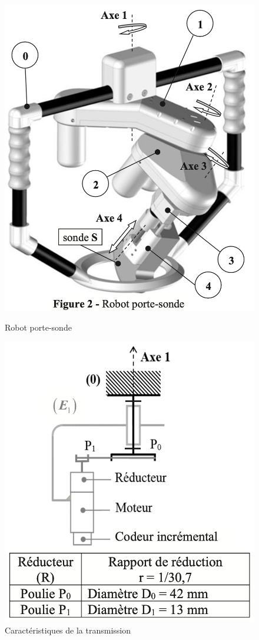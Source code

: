 \begin{figure}[ht!]
\begin{minipage}{0.45\linewidth}
\begin{center}
 \includegraphics[width=0.9\linewidth]{img/fig02}
\end{center}
\caption{Robot porte-sonde}
\label{fig02}
\end{minipage}\hfill
\begin{minipage}{0.45\linewidth}
\begin{center}
 \includegraphics[width=0.9\linewidth]{img/fig03}
\end{center}
\caption{Caractéristiques de la transmission}
\label{fig03}
\end{minipage}
\end{figure}

